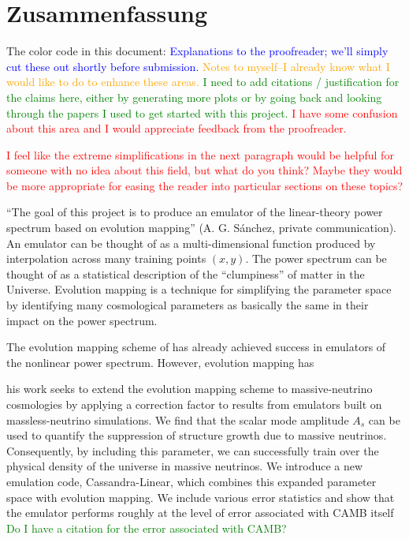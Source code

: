 

\chapter*{Zusammenfassung}

The color code in this document: \textcolor{blue}{Explanations to the
proofreader; we'll simply cut these out shortly before submission.}
\textcolor{orange}{Notes to myself--I already know what I would like to do to
enhance these areas.} \textcolor{green}{I need to add citations / 
justification for the claims here, either by generating more plots or by going
back and looking through the papers I used to get started with this project.}
\textcolor{red}{I have some confusion about this area and I would appreciate
feedback from the proofreader.}

\textcolor{red}{I feel like the extreme simplifications in the next paragraph
would be helpful for someone with no idea about this field, but what do you
think? Maybe they would be more appropriate for easing the reader into
particular sections on these topics?}

``The goal of this project is to produce an emulator of the linear-theory
power spectrum based on evolution mapping'' (A. G. S\'{a}nchez, private
communication). An emulator can be thought of as a multi-dimensional function
produced by interpolation across many training points $(x, y)$. The power
spectrum can be thought of as a statistical description of the ``clumpiness''
of matter in the Universe. Evolution mapping is a technique for simplifying
the parameter space by identifying many cosmological parameters as basically
the same in their impact on the power spectrum.

The evolution mapping scheme of  has already achieved success in
emulators of the nonlinear power spectrum. However, evolution mapping has 

his work seeks to extend the
evolution mapping scheme to massive-neutrino cosmologies by applying a
correction
factor to results from emulators built on massless-neutrino simulations. We
find that the scalar mode amplitude $A_s$ can be used to quantify the
suppression of structure growth due to massive neutrinos. Consequently, by
including this parameter, we can successfully train over the physical density
of the universe in massive neutrinos. We introduce a new emulation code,
Cassandra-Linear, which combines this expanded parameter space with evolution
mapping. We include various error statistics and show that the emulator
performs roughly at the level of error associated with CAMB itself
\textcolor{green}{Do I have a citation for the error associated with CAMB?}